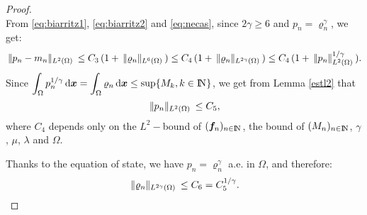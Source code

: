 \documentclass{amsart}
\numberwithin{equation}{section}
\begin{document}
\begin{proof}
\begin{equation}
\end{equation}
From \eqref{eq:biarritz1},  \eqref{eq:biarritz2} and \eqref{eq:necas}, since $2 \gamma \ge 6$ and $p_n={\varrho}_n^\gamma$, we get:
\[
{\hspace{.2em}|\hspace{-.1em}| {p_n-m_n} |\hspace{-.1em}|_{{L^2(\Omega)}}\hspace{.2em}} \le C_3\,(1+ {\hspace{.2em}|\hspace{-.1em}| {{\varrho}_n} |\hspace{-.1em}|_{{L^6(\Omega)}}\hspace{.2em}}) \le C_4\, (1+ {\hspace{.2em}|\hspace{-.1em}| {{\varrho}_n} |\hspace{-.1em}|_{{L^{2\gamma}(\Omega)}}\hspace{.2em}})
\le C_4\, (1+  {\hspace{.2em}|\hspace{-.1em}| {p_n} |\hspace{-.1em}|^{{1/\gamma}}_{{L^2(\Omega)}}\hspace{.2em}}).
\]
Since $\displaystyle \int_\Omega p_n^{1/\gamma} {\, {\rm d}{{\boldsymbol x}}} = \int_\Omega {\varrho}_n{\, {\rm d}{{\boldsymbol x}}} \le \sup\{M_k, k \in {\ifmmode{\rm	I\mkern-3.1mu
N\mkern0.5mu}\else{\rm I\kern-.16em
N\hskip0.5pt\ }\fi\relax}\}$, we get from Lemma \ref{estl2} that
\[
{\hspace{.2em}|\hspace{-.1em}| {p_n} |\hspace{-.1em}|_{{L^2(\Omega)}}\hspace{.2em}} \le C_5,
\]
where $C_4$ depends only on the $L^2-$bound of $(\bm{f}_n)_{{n \in {\ifmmode{\rm	I\mkern-3.1mu
N\mkern0.5mu}\else{\rm I\kern-.16em
N\hskip0.5pt\ }\fi\relax}}}$, the bound of $(M_n)_{{n \in {\ifmmode{\rm	I\mkern-3.1mu
N\mkern0.5mu}\else{\rm I\kern-.16em
N\hskip0.5pt\ }\fi\relax}}}$, $\gamma$, $\mu$, $\lambda$ and $\Omega$.

\medskip
Thanks to the equation of state, we have $p_n={\varrho}_n^\gamma$ a.e. in $\Omega$, and therefore:
\[
{\hspace{.2em}|\hspace{-.1em}| {{\varrho}_n} |\hspace{-.1em}|_{{L^{2\gamma} (\Omega)}}\hspace{.2em}} \le C_6=C_5^{1/ \gamma}.
\]


\end{proof}
\end{document}
